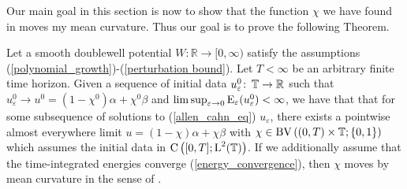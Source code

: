 Our main goal in this section is now to show that the function $ \chi $ we have found in  moves my mean curvature. Thus our goal is to prove the following Theorem.
\begin{theorem}
	\label{convergence_to_twophase_mcf}
	Let a smooth doublewell potential $ W \colon \mathbb{ R } \to [ 0, \infty ) $ satisfy the assumptions (\ref{polynomial_growth})-(\ref{perturbation bound}). Let $ T < \infty $ be an arbitrary finite time horizon. Given a sequence of initial data $ u_{ \varepsilon }^{ 0 } \colon \operatorname{\mathbb{T}} \to \mathbb{ R } $ such that $ u_{ \varepsilon }^{ 0 } \to u^{ 0 } = ( 1- \chi^{ 0} ) \alpha + \chi^{ 0 } \beta $ and $ \limsup_{ \varepsilon \to 0 } \operatorname{E}_{ \varepsilon } ( u_{ \varepsilon }^{ 0 } ) < \infty $, we have that that  for some subsequence of solutions to (\ref{allen_cahn_eq}) $ u_{\varepsilon } $, there exists a pointwise almost everywhere limit $ u = ( 1 - \chi ) \alpha + \chi \beta $ with $ \chi \in \operatorname{BV} \left( ( 0, T ) \times \operatorname{\mathbb{T}} ; \{ 0 , 1 \} \right) $ which assumes the initial data in $ \operatorname{C} \left( [ 0, T ] ; \operatorname{L}^{ 2 }( \operatorname{\mathbb{T}} ) \right) $. If we additionally assume that the time-integrated energies converge (\ref{energy_convergence}), then $ \chi $ moves by mean curvature in the sense of .
\end{theorem} 

